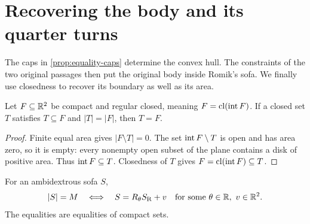 \section{Recovering the body and its quarter turns}\label{sec:recovery}

The caps in \cref{prop:equality-caps} determine the convex hull.
The constraints of the two original passages then put the original
body inside Romik's sofa. We finally use closedness to recover its
boundary as well as its area.

\begin{lemma}\label{lem:regular-closed-recovery}
Let $F\subseteq\mathbb{R}^2$ be compact and regular closed, meaning
$F=\operatorname{cl}(\operatorname{int} F)$. If a closed set $T$ satisfies $T\subseteq F$
and $|T|=|F|$, then $T=F$.
\end{lemma}

\begin{proof}
Finite equal area gives $|F\setminus T|=0$. The set
$\operatorname{int} F\setminus T$ is open and has area zero, so it is empty:
every nonempty open subset of the plane contains a disk of positive
area. Thus $\operatorname{int} F\subseteq T$. Closedness of $T$ gives
$F=\operatorname{cl}(\operatorname{int} F)\subseteq T$.
\end{proof}

\begin{theorem}\label{thm:uniqueness}
For an ambidextrous sofa $S$,
\[
 |S|=M\quad\Longleftrightarrow\quad
 S=R_\theta S_{\mathrm R}+v\quad\text{for some }\theta\in\mathbb{R},\ v\in\mathbb{R}^2.
\]
The equalities are equalities of compact sets.
\end{theorem}

